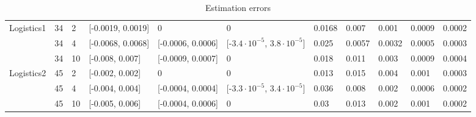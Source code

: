 \documentclass[review]{elsarticle}
\begin{document}
\begin{table}[tbh!]
{\begin{tabular}{|p{0.1cm}|p{0.1cm}|p{0.2cm}|| p{1.05cm}|p{1.05cm}|p{1.4cm}||X{0.6cm}|X{0.6cm}|X{0.6cm}|X{0.6cm}|X{0.6cm}|}
			\multirow{2}{*}{Logistics1} & 34 & 2 & [-0.0019, 0.0019] & 0& 0& 0.0168 & 0.007 & 0.001 & 0.0009 & 0.0002 \\ \cline{2-11}  
			& 34 & 4  & [-0.0068, 0.0068]  & [-0.0006, 0.0006] & [-$3.4{\cdot} 10^{-5}$, $3.8{\cdot} 10^{-5}$] & 0.025 & 0.0057 & 0.0032 & 0.0005 & 0.0003\\ \cline{2-11}  
			& 34 & 10  & [-0.008, 0.007] & [-0.0009, 0.0007] & 0 & 0.018 & 0.011 & 0.003 &0.0009 & 0.0004\\ \hline
			\multirow{2}{*}{Logistics2} & 45 & 2 & [-0.002, 0.002] & 0& 0 & 0.013 & 0.015 & 0.004& 0.001 & 0.0003 \\ \cline{2-11}  
			& 45 & 4  & [-0.004, 0.004] & [-0.0004, 0.0004] & [-$3.3{\cdot} 10^{-5}$, $3.4{\cdot} 10^{-5}$]& 0.036 & 0.008 & 0.002 & 0.0006 &0.0002\\ \cline{2-11}  
			& 45 & 10  &[-0.005, 0.006]  & [-0.0004, 0.0006] & 0 & 0.03 & 0.013 & 0.002 &0.001 & 0.0002 \\ \hline
		\end{tabular}
		\caption{Estimation errors}
		\label{tab:errors1}
	}
\end{table}
\end{document}
